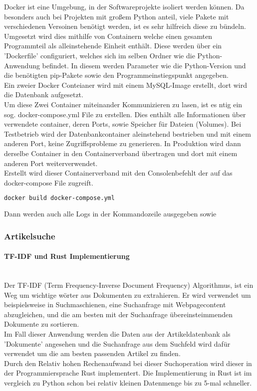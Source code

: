     Docker ist eine Umgebung, in der Softwareprojekte isoliert werden können. Da besonders auch bei Projekten mit großem Python anteil, viele Pakete mit verschiedenen Versoinen benötigt werden, ist es sehr hilfreich diese zu bündeln. \\
    Umgesetzt wird dies mithilfe von Containern welche einen gesamten Programmteil als alleinstehende Einheit enthält. Diese werden über ein 'Dockerfile' configuriert, welches sich im selben Ordner wie die Python-Anwendung befindet. In diesem werden Parameter wie die Python-Version und die benötigten pip-Pakete sowie den Programmeinstiegspunkt angegeben. \\ 
    Ein zweier Docker Conteianer wird mit einem MySQL-Image erstellt, dort wird die Datenbank aufgesetzt. \\
    Um diese Zwei Container miteinander Kommunizieren zu lasen, ist es ntig ein sog. docker-compose.yml File zu erstellen. Dies enthält alle Informationen über verwendete container, deren Ports, sowie Speicher für Dateien (Volumes). Bei Testbetrieb wird der Datenbankcontainer aleinstehend bestrieben und mit einem anderen Port, keine Zugriffsprobleme zu generieren. In Produktion wird dann derselbe Container in den Containerverband übertragen und dort mit einem anderen Port weiterverwendet. \\
    Erstellt wird dieser Containerverband mit den Consolenbefehlt der auf das docker-compose File zugreift. 
    \begin{lstlisting}[language=bash]
        docker build docker-compose.yml\end{lstlisting}
    Dann werden auch alle Logs in der Kommandozeile ausgegeben sowie 


\subsubsection{Artikelsuche}
\paragraph{TF-IDF und Rust Implementierung} \hspace{0pt} \\
Der TF-IDF (Term Frequency-Inverse Document Frequency) Algorithmus, ist ein Weg um wichtige wörter aus Dokumenten zu extrahieren. Er wird verwendet um beispielsweise in Suchmaschienen, eine Suchanfrage mit Webpagecontent abzugleichen, und die am besten mit der Suchanfrage übereinsteimmenden Dokumente zu sortieren. \\
Im Fall dieser Anwendung werden die Daten aus der Artikeldatenbank als 'Dokumente'  angesehen und die Suchanfrage aus dem Suchfeld wird dafür verwendet um die am besten passenden Artikel zu finden.
\\
Durch den Relativ hohen Rechenaufwand bei dieser Suchoperation wird dieser in der Programmiersprache Rust implementert. Die Implementierung in Rust ist im vergleich zu Python schon bei relativ kleinen Datenmenge bis zu 5-mal schneller.

